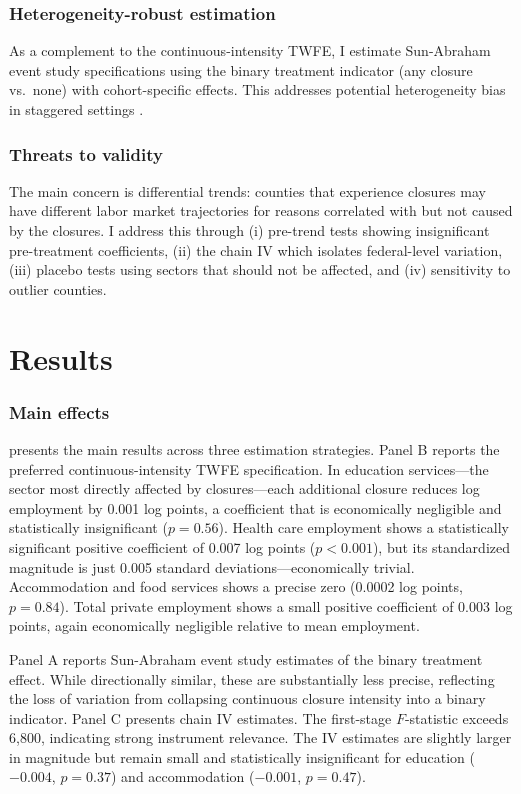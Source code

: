 \documentclass[12pt]{article}
\begin{document}
\subsubsection*{Heterogeneity-robust estimation} As a complement to the continuous-intensity TWFE, I estimate Sun-Abraham event study specifications \citep{sun2021estimating} using the binary treatment indicator (any closure vs.\ none) with cohort-specific effects. This addresses potential heterogeneity bias in staggered settings \citep{goodman2021difference, roth2023pretrends}.

\subsubsection*{Threats to validity} The main concern is differential trends: counties that experience closures may have different labor market trajectories for reasons correlated with but not caused by the closures. I address this through (i) pre-trend tests showing insignificant pre-treatment coefficients, (ii) the chain IV which isolates federal-level variation, (iii) placebo tests using sectors that should not be affected, and (iv) sensitivity to outlier counties.

\section{Results}



\subsubsection*{Main effects}  presents the main results across three estimation strategies. Panel B reports the preferred continuous-intensity TWFE specification. In education services---the sector most directly affected by closures---each additional closure reduces log employment by 0.001 log points, a coefficient that is economically negligible and statistically insignificant ($p = 0.56$). Health care employment shows a statistically significant positive coefficient of 0.007 log points ($p < 0.001$), but its standardized magnitude is just 0.005 standard deviations---economically trivial. Accommodation and food services shows a precise zero (0.0002 log points, $p = 0.84$). Total private employment shows a small positive coefficient of 0.003 log points, again economically negligible relative to mean employment.

Panel A reports Sun-Abraham event study estimates of the binary treatment effect. While directionally similar, these are substantially less precise, reflecting the loss of variation from collapsing continuous closure intensity into a binary indicator. Panel C presents chain IV estimates. The first-stage $F$-statistic exceeds 6,800, indicating strong instrument relevance. The IV estimates are slightly larger in magnitude but remain small and statistically insignificant for education ($-0.004$, $p = 0.37$) and accommodation ($-0.001$, $p = 0.47$).
\end{document}
